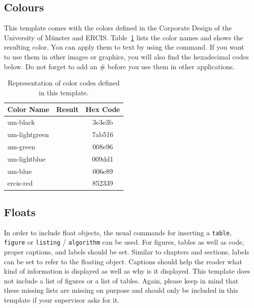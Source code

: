 \documentclass[
    language=german, %
    thesis=bachelor, %
    supervisor=postdoc, %
    multiauthor=false, %
    ]{settings/csssa-thesis}
\begin{document}
\subsection{Colours}\label{ch02:sec2:color}

This template comes with the colors defined in the Corporate Design of the University of Münster and ERCIS. Table~\ref{sec2:tab:colors} lists the color names and shows the resulting color. You can apply them to text by using the  command. If you want to use them in other images or graphics, you will also find the hexadecimal codes below. Do not forget to add an \# before you use them in other applications.

\begin{table}[H]
    \centering
    \caption{Representation of color codes defined in this template.}
    \label{sec2:tab:colors}
    \begin{tabular}{@{}lcc@{}}
        \toprule
        \textbf{Color Name} & \textbf{Result} & \textbf{Hex Code} \\ \midrule
            um-black     & \textcolor{um-black}{\blacksmiley{}} & 3e3e3b \\
            um-lightgreen  & \textcolor{um-lightgreen}{\blacksmiley{}} & 7ab516 \\
            um-green      & \textcolor{um-green}{\blacksmiley{}} & 008e96 \\
            um-lightblue      & \textcolor{um-lightblue}{\blacksmiley{}} & 009dd1 \\
            um-blue     & \textcolor{um-blue}{\blacksmiley{}} & 006e89 \\
            ercis-red      & \textcolor{ercis-red}{\blacksmiley{}} & 852339 \\
			\bottomrule
    \end{tabular}
\end{table}

\subsection{Floats}\label{ch02:sec3:floats}

In order to include float objects, the usual commands for inserting a   \texttt{table}, \texttt{figure} or \texttt{listing} / \texttt{algorithm} can be used. For figures, tables as well as code, proper captions, and labels should be set. Similar to chapters and sections, labels can be set to refer to the floating object. Captions should help the reader what kind of information is displayed as well as why is it displayed. This template does not include a list of figures or a list of tables. Again, please keep in mind that these missing lists are missing on purpose and should only be included in this template if your supervisor asks for it.
\end{document}
